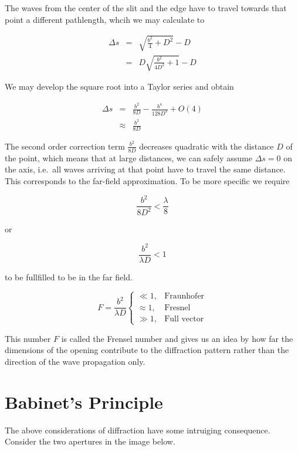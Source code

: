 \documentclass[
  a4paper,
]{book}
\begin{document}
The waves from the center of the slit and the edge have to travel
towards that point a different pathlength, whcih we may calculate to

\begin{eqnarray}
\Delta s &=&  \sqrt{\frac{b^2}{4}+D^2}-D\\
&=& D\sqrt{\frac{b^2}{4D^2}+1}-D
\end{eqnarray}

We may develop the square root into a Taylor series and obtain

\begin{eqnarray}
\Delta s &=& \frac{b^2}{8D}-\frac{b^4}{128 D^3}+O(4)\\
&\approx & \frac{b^2}{8D}
\end{eqnarray}

The second order correction term \(\frac{b^2}{8D}\) decreases quadratic
with the distance \(D\) of the point, which means that at large
distances, we can safely assume \(\Delta s=0\) on the axis, i.e.~all
waves arriving at that point have to travel the same distance. This
corresponds to the far-field approximation. To be more specific we
require

\[
\frac{b^2}{8D^2}<\frac{\lambda}{8}
\]

or

\[
\frac{b^2}{\lambda D}<1
\]

to be fullfilled to be in the far field.

\[
F=\frac{b^2}{\lambda D}
\begin{cases}
\ll 1 ,&\textrm{Fraunhofer}\\
\approx 1,& \textrm{Fresnel}\\
\gg 1, & \textrm{Full vector}
\end{cases}
\]

This number \(F\) is called the Frensel number and gives us an idea by
how far the dimensions of the opening contribute to the diffraction
pattern rather than the direction of the wave propagation only.

\section{Babinet's Principle}\label{babinets-principle}

The above considerations of diffraction have some intruiging
consequence. Consider the two apertures in the image below.
\end{document}
